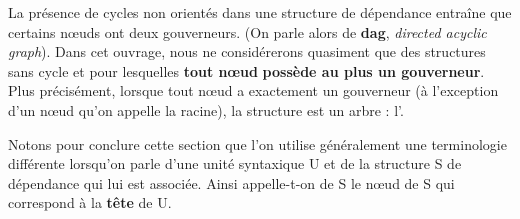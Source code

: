 La présence de cycles non orientés dans une structure de dépendance entraîne que certains nœuds ont deux gouverneurs. (On parle alors de \textbf{dag}, \textit{directed acyclic graph}). Dans cet ouvrage, nous ne considérerons quasiment que des structures sans cycle et pour lesquelles \textbf{tout nœud} \textbf{possède au plus un gouverneur}. Plus précisément, lorsque tout nœud a exactement un gouverneur (à l’exception d’un nœud qu’on appelle la racine), la structure est un arbre : l’.

Notons pour conclure cette section que l’on utilise généralement une terminologie différente lorsqu’on parle d’une unité syntaxique U et de la structure S de dépendance qui lui est associée. Ainsi appelle-t-on  de S le nœud de S qui correspond à la \textbf{tête} de U.

